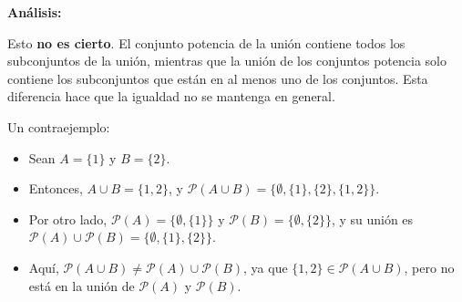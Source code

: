 \begin{solution}
\begin{enumerate}
   \textbf{Análisis:}

   Esto \textbf{no es cierto}. El conjunto potencia de la unión contiene todos los subconjuntos de la unión, mientras que la unión de los conjuntos potencia solo contiene los subconjuntos que están en al menos uno de los conjuntos. Esta diferencia hace que la igualdad no se mantenga en general.

   Un contraejemplo:
   \begin{itemize}
        \item Sean \( A = \{1\} \) y \( B = \{2\} \).
        \item Entonces, \( A \cup B = \{1, 2\} \), y \( \mathscr{P}(A \cup B) = \{ \emptyset, \{1\}, \{2\}, \{1, 2\} \} \).
        \item Por otro lado, \( \mathscr{P}(A) = \{ \emptyset, \{1\} \} \) y \( \mathscr{P}(B) = \{ \emptyset, \{2\} \} \), y su unión es \( \mathscr{P}(A) \cup \mathscr{P}(B) = \{ \emptyset, \{1\}, \{2\} \} \).
        \item Aquí, \( \mathscr{P}(A \cup B) \neq \mathscr{P}(A) \cup \mathscr{P}(B) \), ya que \( \{1, 2\} \in \mathscr{P}(A \cup B) \), pero no está en la unión de \( \mathscr{P}(A) \) y \( \mathscr{P}(B) \).
   \end{itemize}
\end{enumerate}
\end{solution}